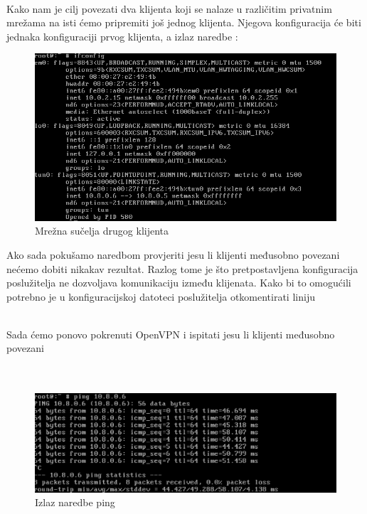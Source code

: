         \noindent
         \\

        Kako nam je cilj povezati dva klijenta koji se nalaze u različitim
        privatnim mrežama na isti ćemo pripremiti još jednog klijenta. Njegova
        konfiguracija će biti jednaka konfiguraciji prvog klijenta, a izlaz
        naredbe :
        \begin{figure}[H]
            \centering
            \includegraphics[scale=0.45]{slike/client2Ifconfig}
            \caption{Mrežna sučelja drugog klijenta}
        \end{figure}

        \noindent
        Ako sada pokušamo naredbom
        provjeriti jesu li klijenti međusobno povezani nećemo dobiti nikakav
        rezultat. Razlog tome je što pretpostavljena konfiguracija poslužitelja
        ne dozvoljava komunikaciju između klijenata. Kako bi to omogućili
        potrebno je u konfiguracijskoj datoteci poslužitelja otkomentirati liniju 

        \noindent 
         \\

        \noindent
        Sada ćemo ponovo pokrenuti OpenVPN i ispitati jesu li klijenti
        međusobno povezani \\

        \noindent
         \\
         \\
        \begin{figure}[H]
            \centering
            \includegraphics[scale=0.5]{slike/pingResult}
            \caption{Izlaz naredbe ping}
        \end{figure}

